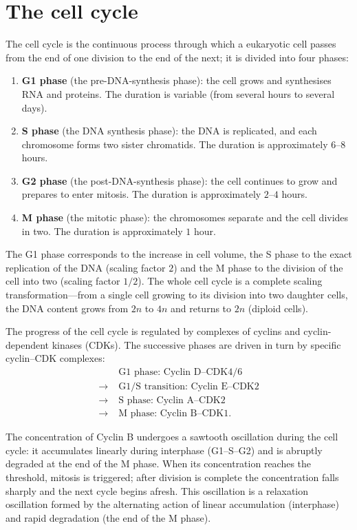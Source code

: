 \section{The cell cycle}

\begin{definition}\label{def:cell_cycle}
The cell cycle is the continuous process through which a eukaryotic cell passes from the end of one division to the end of the next; it is divided into four phases:
\begin{enumerate}[label=(\roman*)]
    \item \textbf{G1 phase} (the pre-DNA-synthesis phase): the cell grows and synthesises RNA and proteins. The duration is variable (from several hours to several days).
    \item \textbf{S phase} (the DNA synthesis phase): the DNA is replicated, and each chromosome forms two sister chromatids. The duration is approximately $6$--$8$ hours.
    \item \textbf{G2 phase} (the post-DNA-synthesis phase): the cell continues to grow and prepares to enter mitosis. The duration is approximately $2$--$4$ hours.
    \item \textbf{M phase} (the mitotic phase): the chromosomes separate and the cell divides in two. The duration is approximately $1$ hour.
\end{enumerate}
The G1 phase corresponds to the increase in cell volume, the S phase to the exact replication of the DNA (scaling factor $2$) and the M phase to the division of the cell into two (scaling factor $1/2$). The whole cell cycle is a complete scaling transformation---from a single cell growing to its division into two daughter cells, the DNA content grows from $2n$ to $4n$ and returns to $2n$ (diploid cells).
\end{definition}

\begin{proposition}
\label{prop:cyclin_cdk_oscillation}
The progress of the cell cycle is regulated by complexes of cyclins and
cyclin-dependent kinases (CDKs).
The successive phases are driven in turn by specific cyclin--CDK complexes:
\[
\begin{aligned}
&\text{G1 phase: Cyclin D--CDK4/6} \\
\longrightarrow\;&\text{G1/S transition: Cyclin E--CDK2} \\
\longrightarrow\;&\text{S phase: Cyclin A--CDK2} \\
\longrightarrow\;&\text{M phase: Cyclin B--CDK1}.
\end{aligned}
\]

The concentration of Cyclin B undergoes a sawtooth oscillation during the cell cycle:
it accumulates linearly during interphase (G1--S--G2) and is abruptly degraded at the end of the M phase.
When its concentration reaches the threshold, mitosis is triggered;
after division is complete the concentration falls sharply and the next cycle begins afresh.
This oscillation is a relaxation oscillation formed by the alternating action of linear accumulation (interphase) and rapid degradation (the end of the M phase).
\end{proposition}

